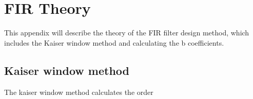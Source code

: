 \chapter{FIR Theory}
This appendix will describe the theory of the FIR filter design method, which includes the Kaiser window method and calculating the b coefficients.

% 



\section{Kaiser window method}
The kaiser window method calculates the order 



